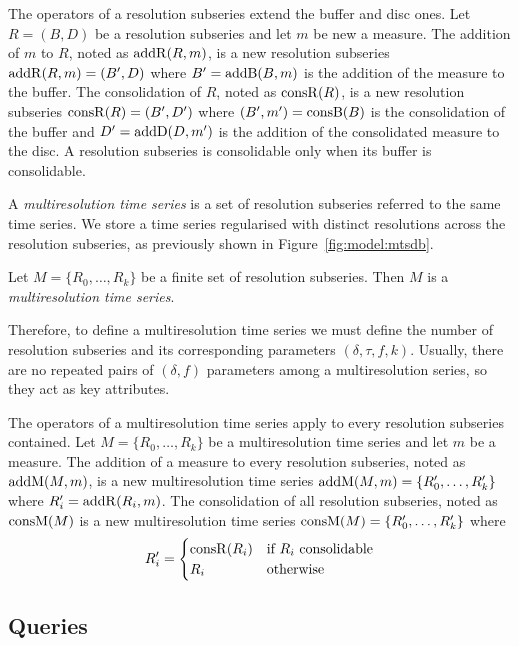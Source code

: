 The operators of a resolution subseries extend the buffer and disc
ones. Let $R=(B,D)$ be a resolution subseries and let $m$ be new a
measure.  The addition of $m$ to $R$, noted as $\operatorname{addR}(R,m)$, is a new
resolution subseries $\operatorname{addR}(R,m)=(B',D)$ where $B'= \operatorname{addB}(B,m)$ is the
addition of the measure to the buffer.  The consolidation of $R$,
noted as $\operatorname{consR}(R)$, is a new resolution subseries
$\operatorname{consR}(R)=(B',D')$ where $(B',m') = \operatorname{consB}(B)$ is the consolidation
of the buffer and $D'= \operatorname{addD}(D,m')$ is the addition of the
consolidated measure to the disc. A resolution subseries is
consolidable only when its buffer is consolidable.

A \emph{multiresolution time series} is a set of resolution subseries
referred to the same time series. We store a time series regularised
with distinct resolutions across the resolution subseries, as
previously shown in Figure~\ref{fig:model:mtsdb}.

\begin{definition}
  Let $M=\{R_0, \dots, R_k\}$ be a finite set of resolution
  subseries. Then $M$ is a \emph{multiresolution time series}.
\end{definition}

Therefore, to define a multiresolution time series we must define the
number of resolution subseries and its corresponding parameters
$(\delta,\tau,f,k)$.  Usually, there are no repeated pairs of
$(\delta,f)$ parameters among a multiresolution series, so they act as
key attributes.

The operators of a multiresolution time series apply to every
resolution subseries contained. Let
$M=\{R_0,\allowbreak\dots,\allowbreak R_k\}$ be a multiresolution time
series and let $m$ be a measure. The addition of a measure to every
resolution subseries, noted as $\operatorname{addM}(M,m)$, is a new multiresolution
time series $\operatorname{addM}(M,m)=\{R'_0, \dots,\allowbreak R'_k\}$ where
$R'_i=\operatorname{addR}(R_i,m)$. The consolidation of all resolution subseries,
noted as $\operatorname{consM}(M)$ is a new multiresolution time series
$\operatorname{consM}(M)=\{R'_0,\allowbreak\dots,\allowbreak R'_k\}$ where
\[R'_i=
\begin{cases}
\operatorname{consR}(R_i) & \text{if } R_i \text{ consolidable}\\
 R_i & \text{otherwise}
\end{cases}
\]


\subsection{Queries}

